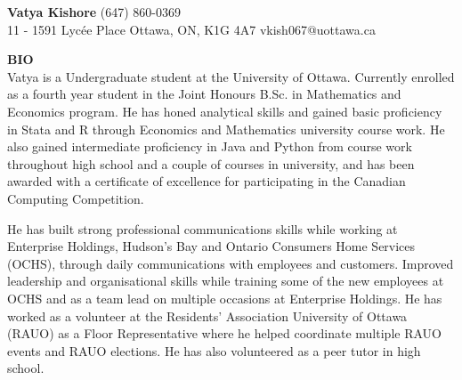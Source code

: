 \textbf{\LARGE{Vatya Kishore}} \hfill (647) 860-0369\\
11 - 1591 Lycée Place Ottawa, ON, K1G 4A7 \hfill vkish067@uottawa.ca\\
\newline

\noindent
\textbf{\large{BIO}}\\
Vatya is a Undergraduate student at the University of Ottawa. Currently enrolled as a fourth year student in the Joint Honours B.Sc. in Mathematics and Economics program. He has honed analytical skills and gained basic proficiency in Stata and R through Economics and Mathematics university course work. He also gained intermediate proficiency in Java and Python from course work throughout high school and a couple of courses in university, and has been awarded with a certificate of excellence for participating in the Canadian Computing Competition.\par He has built strong professional communications skills while working at Enterprise Holdings, Hudson's Bay and Ontario Consumers Home Services (OCHS), through daily communications with employees and customers. Improved leadership and organisational skills while training some of the new employees at OCHS and as a team lead on multiple occasions at Enterprise Holdings. He has worked as a volunteer at the Residents’ Association University of Ottawa (RAUO) as a Floor Representative where he helped coordinate multiple RAUO events and RAUO elections. He has also volunteered as a peer tutor in high school.\\


